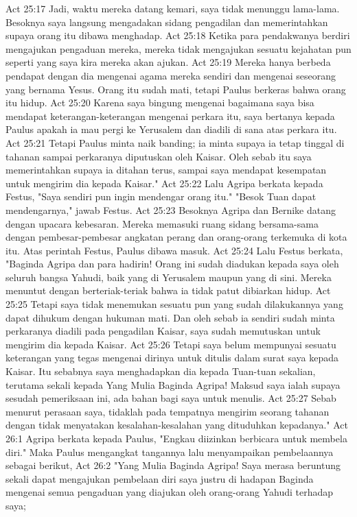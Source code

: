 Act 25:17  Jadi, waktu mereka datang kemari, saya tidak menunggu lama-lama. Besoknya saya langsung mengadakan sidang pengadilan dan memerintahkan supaya orang itu dibawa menghadap.
Act 25:18  Ketika para pendakwanya berdiri mengajukan pengaduan mereka, mereka tidak mengajukan sesuatu kejahatan pun seperti yang saya kira mereka akan ajukan.
Act 25:19  Mereka hanya berbeda pendapat dengan dia mengenai agama mereka sendiri dan mengenai seseorang yang bernama Yesus. Orang itu sudah mati, tetapi Paulus berkeras bahwa orang itu hidup.
Act 25:20  Karena saya bingung mengenai bagaimana saya bisa mendapat keterangan-keterangan mengenai perkara itu, saya bertanya kepada Paulus apakah ia mau pergi ke Yerusalem dan diadili di sana atas perkara itu.
Act 25:21  Tetapi Paulus minta naik banding; ia minta supaya ia tetap tinggal di tahanan sampai perkaranya diputuskan oleh Kaisar. Oleh sebab itu saya memerintahkan supaya ia ditahan terus, sampai saya mendapat kesempatan untuk mengirim dia kepada Kaisar."
Act 25:22  Lalu Agripa berkata kepada Festus, "Saya sendiri pun ingin mendengar orang itu." "Besok Tuan dapat mendengarnya," jawab Festus.
Act 25:23  Besoknya Agripa dan Bernike datang dengan upacara kebesaran. Mereka memasuki ruang sidang bersama-sama dengan pembesar-pembesar angkatan perang dan orang-orang terkemuka di kota itu. Atas perintah Festus, Paulus dibawa masuk.
Act 25:24  Lalu Festus berkata, "Baginda Agripa dan para hadirin! Orang ini sudah diadukan kepada saya oleh seluruh bangsa Yahudi, baik yang di Yerusalem maupun yang di sini. Mereka menuntut dengan berteriak-teriak bahwa ia tidak patut dibiarkan hidup.
Act 25:25  Tetapi saya tidak menemukan sesuatu pun yang sudah dilakukannya yang dapat dihukum dengan hukuman mati. Dan oleh sebab ia sendiri sudah minta perkaranya diadili pada pengadilan Kaisar, saya sudah memutuskan untuk mengirim dia kepada Kaisar.
Act 25:26  Tetapi saya belum mempunyai sesuatu keterangan yang tegas mengenai dirinya untuk ditulis dalam surat saya kepada Kaisar. Itu sebabnya saya menghadapkan dia kepada Tuan-tuan sekalian, terutama sekali kepada Yang Mulia Baginda Agripa! Maksud saya ialah supaya sesudah pemeriksaan ini, ada bahan bagi saya untuk menulis.
Act 25:27  Sebab menurut perasaan saya, tidaklah pada tempatnya mengirim seorang tahanan dengan tidak menyatakan kesalahan-kesalahan yang dituduhkan kepadanya."
Act 26:1  Agripa berkata kepada Paulus, "Engkau diizinkan berbicara untuk membela diri." Maka Paulus mengangkat tangannya lalu menyampaikan pembelaannya sebagai berikut,
Act 26:2  "Yang Mulia Baginda Agripa! Saya merasa beruntung sekali dapat mengajukan pembelaan diri saya justru di hadapan Baginda mengenai semua pengaduan yang diajukan oleh orang-orang Yahudi terhadap saya;
